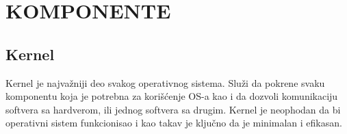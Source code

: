 \documentclass[a4paper,14pt]{article}
\begin{document}
\begin{figure}[h]
	\centering
\end{figure}
\newpage

\section{KOMPONENTE}
\subsection{Kernel}
Kernel\cite{kernel} je najvažniji deo svakog operativnog sistema. Služi da pokrene svaku komponentu koja je potrebna za korišćenje OS-a kao i da dozvoli komunikaciju softvera sa hardverom, ili jednog softvera sa drugim. Kernel je neophodan da bi operativni sistem funkcionisao i kao takav je ključno da je minimalan i efikasan.
\end{document}
